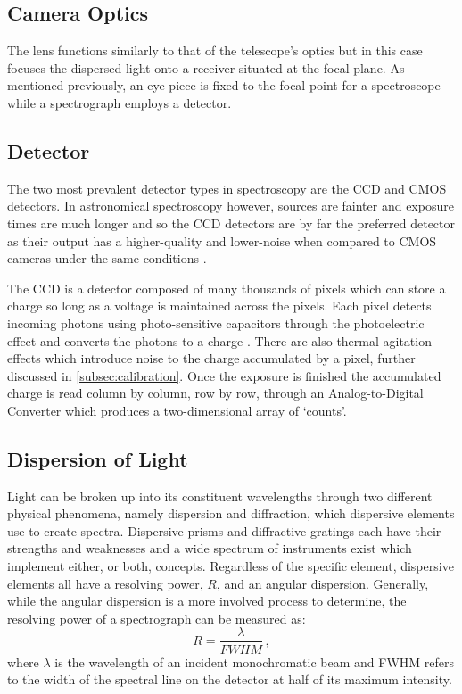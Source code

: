 \subsection{Camera Optics}

The lens functions similarly to that of the telescope's optics but in this case focuses the dispersed light onto a receiver situated at the focal plane.
As mentioned previously, an eye piece is fixed to the focal point for a spectroscope while a spectrograph employs a detector.

\subsection{Detector}

The two most prevalent detector types in spectroscopy are the \gls{CCD} and \gls{CMOS} detectors.
In astronomical spectroscopy however, sources are fainter and exposure times are much longer and so the \gls{CCD} detectors are by far the preferred detector as their output has a higher-quality and lower-noise when compared to \gls{CMOS} cameras under the same conditions \citep{CCDvsCMOS}.

The \gls{CCD} is a detector composed of many thousands of pixels which can store a charge so long as a voltage is maintained across the pixels.
Each pixel detects incoming photons using photo-sensitive capacitors through the photoelectric effect and converts the photons to a charge \citep{CCDastronomy}.
There are also thermal agitation effects which introduce noise to the charge accumulated by a pixel, further discussed in \autoref{subsec:calibration}.
Once the exposure is finished the accumulated charge is read column by column, row by row, through an Analog-to-Digital Converter which produces a two-dimensional array of `counts'.


\subsection{Dispersion of Light} \label{subsec:dispersion}

Light can be broken up into its constituent wavelengths through two different physical phenomena, namely dispersion and diffraction, which dispersive elements use to create spectra.
Dispersive prisms and diffractive gratings each have their strengths and weaknesses and a wide spectrum of instruments exist which implement either, or both, concepts.
Regardless of the specific element, dispersive elements all have a resolving power, $R$, and an angular dispersion.
Generally, while the angular dispersion is a more involved process to determine, the resolving power of a spectrograph can be measured as:
\begin{equation} \label{eq:resolving_power}
    R = \frac{\lambda}{FWHM}\,,
\end{equation}
where $\lambda$ is the wavelength of an incident monochromatic beam and \gls{FWHM} refers to the width of the spectral line on the detector at half of its maximum intensity.

